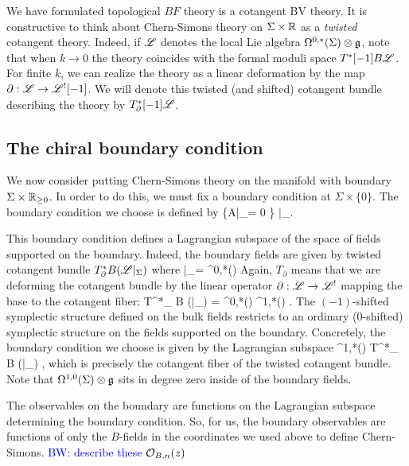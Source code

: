 \documentclass[10pt]{amsart}
\def\brian{\textcolor{blue}{BW: }\textcolor{blue}}
\begin{document}
We have formulated topological $BF$ theory is a cotangent BV theory.
It is constructive to think about Chern-Simons theory on $\Sigma \times \mathbb R$ as a {\em twisted} cotangent theory.
Indeed, if $\mathscr L$ denotes the local Lie algebra $\Omega^{0,*}(\Sigma) \otimes \mathfrak g$, note that when $k \to 0$ the theory coincides with the formal moduli space $T^*[-1] B \mathscr L$. 
For finite $k$, we can realize the theory as a linear deformation by the map $\partial : \mathscr L \to \mathscr L^! [-1]$.
We will denote this twisted (and shifted) cotangent bundle describing the theory by $T_\partial^*[-1] \mathscr L$. 

\subsection{The chiral boundary condition}

We now consider putting Chern-Simons theory on the manifold with boundary $\Sigma \times \mathbb R_{\geq 0}$.
In order to do this, we must fix a boundary condition at $\Sigma \times \{0\}$. 
The boundary condition we choose is defined by
\ben
\left\{A|_\Sigma = 0 \right\} |_{\Sigma}.
\een

This boundary condition defines a Lagrangian subspace of the space of fields supported on the boundary. 
Indeed, the boundary fields are given by twisted cotangent bundle $T^*_{\partial} B (\mathscr L|_\Sigma)$ where
\ben
\sL|_\Sigma = \Omega^{0,*}(\Sigma) \tensor \fg
\een 
Again, $T_\partial$ means that we are deforming the cotangent bundle by the linear operator $\partial : \mathscr L \to \mathscr L^!$ mapping the base to the cotangent fiber:
\ben
T^*_{\partial} B (\sL|_\Sigma) = \Omega^{0,*}(\Sigma) \tensor \fg[1] \xto{\partial} \Omega^{1,*}(\Sigma) \tensor \fg .
\een
The $(-1)$-shifted symplectic structure defined on the bulk fields restricts to an ordinary ($0$-shifted) symplectic structure on the fields supported on the boundary.
Concretely, the boundary condition we choose is given by the Lagrangian subspace 
\ben
\Omega^{1,*}(\Sigma) \tensor \fg  \subset T^*_{\partial} B (\sL|_\Sigma) , 
\een
which is precisely the cotangent fiber of the twisted cotangent bundle.
Note that $\Omega^{1,0}(\Sigma) \otimes \mathfrak g$ sits in degree zero inside of the boundary fields.

The observables on the boundary are functions on the Lagrangian subspace determining the boundary condition. 
So, for us, the boundary observables are functions of only the $B$-fields in the coordinates we used above to define Chern-Simons.
\brian{describe these $\mathcal O_{B, n}(z)$}
\end{document}
